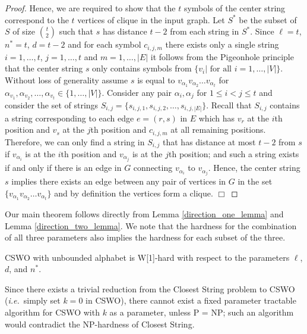 \begin{proof} Hence, we are required to show that the $t$ symbols of the center string correspond to the $t$ vertices of clique in the input graph.  Let $S^*$ be the subset of $S$ of size $t\choose 2$ such that $s$ has distance $t - 2$ from each string in $S^*$. Since $\ell = t$, $n^* = t$, $d = t -2$ and for each symbol $c_{i,j,m}$ there exists only a single string  $i = 1, \ldots, t$, $ j = 1, \ldots, t$ and $m = 1, \ldots, |E|$ it follows from the Pigeonhole principle that the center string $s$ only contains symbols from $\{v_i | \mbox{  for all } i = 1, \ldots, |V|\}$. Without loss of generality assume $s$ is equal to $v_{\alpha_1} v_{\alpha_2}\ldots v_{\alpha_t}$ for $\alpha_{v_1}, \alpha_{v_2}, \ldots, \alpha_{v_t} \in \{1, \ldots, |V|\}$. Consider any pair $\alpha_i, \alpha_j$ for $1 \leq i < j \leq t$ and consider the set of strings $S_{i,j} = \{ s_{i,j,1}, s_{i,j,2}, \ldots, s_{i,j,|E|} \}$.  Recall that $S_{i,j}$ contains a string corresponding to each edge $e = (r, s)$ in $E$ which has $v_r$ at the $i$th position and $v_s$ at the $j$th position and $c_{i,j,m}$ at all remaining positions.  Therefore, we can only find a string in $S_{i,j}$ that has distance at most $t - 2$ from $s$ if $v_{\alpha_i}$ is at the $i$th position and $v_{\alpha_j}$ is at the $j$th position; and such a string exists if and only if there is an edge in $G$ connecting $v_{\alpha_i}$ to $v_{\alpha_j}$. Hence, the center string $s$ implies there exists an edge between any pair of vertices in $G$ in the set $\{v_{\alpha_1} v_{\alpha_2}\ldots v_{\alpha_t}\}$ and by definition the vertices form a clique. \hfill $\Box$  \end{proof}

Our main theorem follows directly from Lemma \ref{direction_one_lemma} and Lemma \ref{direction_two_lemma}.  We note that the hardness for the combination of all three parameters also implies the hardness for each subset of the three. 

\begin{theorem} {\sc CSWO} with unbounded alphabet is W[1]-hard with respect to the parameters $\ell$, $d$, and $n^*$.\end{theorem}

Since there exists a trivial reduction from the {\sc Closest String} problem to {\sc CSWO} ({\em i.e.}\ simply set $k = 0$ in {\sc CSWO}), there cannot exist a fixed parameter tractable algorithm for {\sc CSWO} with $k$ as a parameter, unless P = NP; such an algorithm would contradict the NP-hardness of {\sc Closest String}. 

